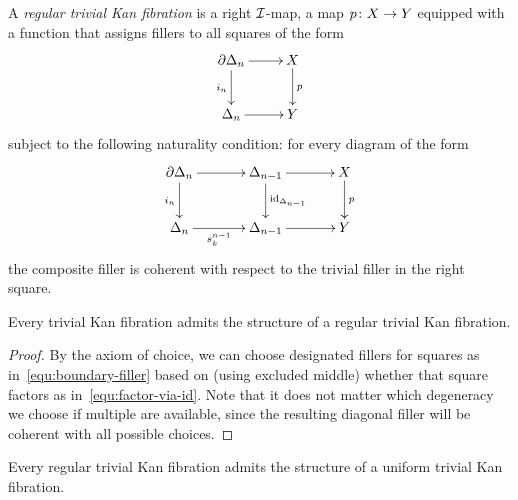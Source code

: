 \documentclass[reqno,10pt,a4paper,oneside]{amsart}
\begin{document}
\begin{definition} A \emph{regular trivial Kan fibration} is a right $\cal{I}$-map, \ie a map $p \co X \to Y$ 
equipped with a function that assigns fillers to all squares of the form
\begin{equation}
\label{equ:boundary-filler}
\xycenter{
\partial \Delta_n \ar[d]_{i_n} \ar[r] & X \ar[d]^{p} \\
\Delta_n \ar[r] & Y } 
\end{equation}
subject to the following naturality condition: for every diagram of the form
\begin{equation}
\label{equ:factor-via-id}
{\vcenter{\hbox{\xymatrix@C=1.2cm{
  \partial \Delta_n
  \ar[r]
  \ar[d]_{i_n}
&
  \Delta_{n-1}
  \ar[r]
  \ar[d]^{\id_{\Delta_{n-1}}}
&
  X
  \ar[d]^{p}
\\
  \Delta_n
  \ar[r]_-{s_k^{n-1}}
&
  \Delta_{n-1}
  \ar[r]
&
  Y
}}}}
\end{equation}
the composite filler is coherent with respect to the trivial filler in the right square. 
\end{definition}


\begin{lemma}[ZFC] \label{triv-Kan-is-regular}
Every trivial Kan fibration admits the structure of a regular trivial Kan fibration.
\end{lemma}

\begin{proof} By the axiom of choice, we can choose  designated fillers for squares as in~\eqref{equ:boundary-filler}
 based on (using excluded middle) whether that square factors as in~\eqref{equ:factor-via-id}. Note that it does not matter which degeneracy we choose if multiple are available, since the resulting diagonal filler will be coherent with 
 all possible choices.
\end{proof} 


\begin{lemma} \label{reg-triv-is-unif-Kan}
Every regular trivial Kan fibration admits the structure of a uniform trivial Kan fibration.
\end{lemma}
\end{document}
